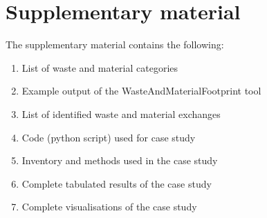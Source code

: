 \documentclass[final,5p,authoryear]{elsarticle}
\begin{document}
\section*{Supplementary material}
    The supplementary material contains the following:
    \begin{enumerate}
        \item List of waste and material categories
        \item Example output of the WasteAndMaterialFootprint tool
        \item List of identified waste and material exchanges
        \item Code (python script) used for case study
        \item Inventory and methods used in the case study
        \item Complete tabulated results of the case study
        \item Complete visualisations of the case study
    \end{enumerate}



    


\end{document}
